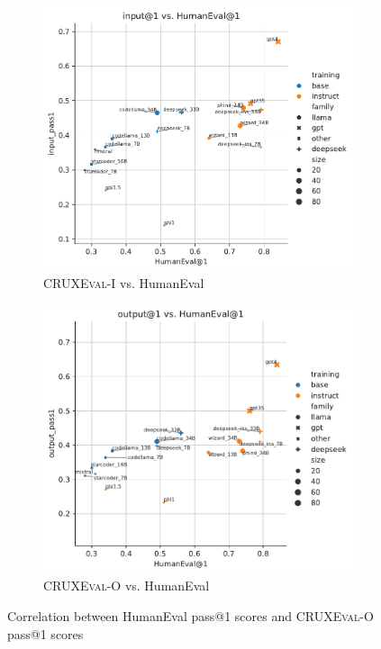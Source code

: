 \documentclass{article}
\newcommand{\benchmarki}{\textsc{CRUXEval-I}\xspace}
\newcommand{\benchmarko}{\textsc{CRUXEval-O}\xspace}
\begin{document}
\begin{figure}[H]
     \centering
     \begin{subfigure}[b]{0.49\textwidth}
         \centering
         \includegraphics[scale=0.49]{figs/scatter/HumanEval_1_vs_input_pass1.pdf}
         \caption{\benchmarki vs. HumanEval}
         \label{fig:quant-analysis-humaneval-correlation-input}
     \end{subfigure}
     \hfill
     \begin{subfigure}[b]{0.49\textwidth}
         \centering
         \includegraphics[scale=0.49]{figs/scatter/HumanEval_1_vs_output_pass1.pdf}
         \caption{\benchmarko vs. HumanEval}
         \label{fig:quant-analysis-humaneval-correlation-output}
     \end{subfigure}
     \caption{Correlation between HumanEval pass@1 scores and \benchmarko pass@1 scores}
     \label{fig:quant-analysis-humaneval-correlation-1}
\end{figure}
\end{document}
